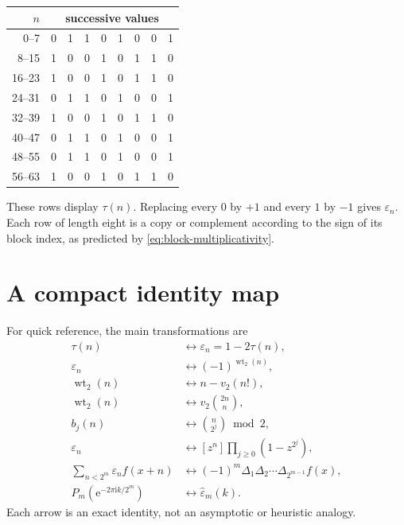 \documentclass[11pt,oneside]{article}
\theoremstyle{definition}
\theoremstyle{remark}
\newcommand{\e}{\mathrm e}
\newcommand{\ii}{\mathrm i}
\newcommand{\wt}{\operatorname{wt}_2}
\newcommand{\vtwo}{v_2}
\begin{document}
\begin{center}
\small
\begin{longtable}{@{}r|*{8}{c}@{}}
\toprule
\(n\) & \multicolumn{8}{c}{successive values}\\
\midrule
\endhead
0--7   & 0&1&1&0&1&0&0&1\\
8--15  & 1&0&0&1&0&1&1&0\\
16--23 & 1&0&0&1&0&1&1&0\\
24--31 & 0&1&1&0&1&0&0&1\\
32--39 & 1&0&0&1&0&1&1&0\\
40--47 & 0&1&1&0&1&0&0&1\\
48--55 & 0&1&1&0&1&0&0&1\\
56--63 & 1&0&0&1&0&1&1&0\\
\bottomrule
\end{longtable}
\end{center}
These rows display \(\tau(n)\).  Replacing every \(0\) by \(+1\) and every
\(1\) by \(-1\) gives \(\varepsilon_n\).  Each row of length eight is a copy
or complement according to the sign of its block index, as predicted by
\eqref{eq:block-multiplicativity}.

\section{A compact identity map}
\label{app:identity-map}

For quick reference, the main transformations are
\begin{align*}
 \tau(n)
 &\longleftrightarrow \varepsilon_n=1-2\tau(n),\\
 \varepsilon_n
 &\longleftrightarrow (-1)^{\wt(n)},\\
 \wt(n)
 &\longleftrightarrow n-\vtwo(n!),\\
 \wt(n)
 &\longleftrightarrow \vtwo\binom{2n}{n},\\
 b_j(n)
 &\longleftrightarrow \binom{n}{2^j}\bmod2,\\
 \varepsilon_n
 &\longleftrightarrow [z^n]\prod_{j\ge0}(1-z^{2^j}),\\
 \sum_{n<2^m}\varepsilon_nf(x+n)
 &\longleftrightarrow (-1)^m\Delta_1\Delta_2\cdots
   \Delta_{2^{m-1}}f(x),\\
 P_m(\e^{-2\pi\ii k/2^m})
 &\longleftrightarrow \widehat\varepsilon_m(k).
\end{align*}
Each arrow is an exact identity, not an asymptotic or heuristic analogy.
\end{document}
